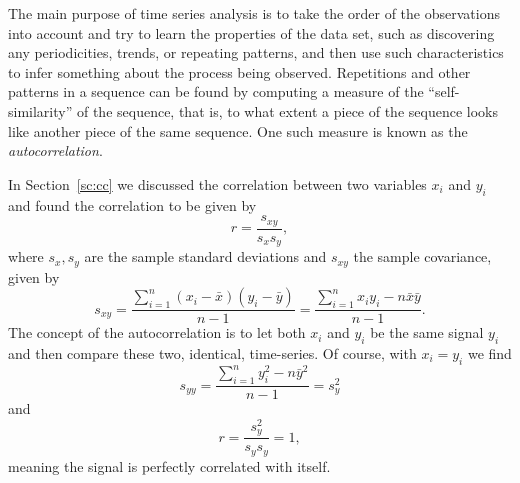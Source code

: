 	The main purpose of time series analysis is to take the order of the observations into account 
and try to learn the properties of the data set, such as discovering any periodicities, trends, or repeating patterns, and 
then use such characteristics to infer something about the process being observed.  Repetitions and 
other patterns in a sequence can be found by computing a measure of the ``self-similarity'' of the 
sequence, that is, to what extent a piece of the sequence looks like another piece of the same sequence.  One such 
measure is known as the \emph{autocorrelation}.
     
In Section~\ref{sc:cc} we discussed the correlation between two variables $x_i$ and $y_i$ and found the 
correlation to be given by 
\begin{equation}
r = \displaystyle \frac{s_{xy}}{s_x s_y},
\end{equation}
where $s_x, s_y$ are the sample standard deviations and $s_{xy}$ the sample covariance, given by
\begin{equation}
s_{xy} = \frac{\displaystyle \sum^n_{i=1} (x_i - \bar{x})(y_i - \bar{y})}{n-1} = \frac{\displaystyle  \sum^n_{i=1} x_i y_i - n \bar{x} \bar{y}}{n-1}.
\end{equation}
The concept of the autocorrelation is to let both $x_i$ and $y_i$ be the same signal $y_i$ and then compare 
these two, identical, time-series.  Of course, with 
$x_i = y_i$ we find
\begin{equation}
s_{yy} = \frac{\displaystyle \sum^n_{i=1} y^2_i -  n\bar{y}^2}{n-1} = s^2 _y
\end{equation}
and
\begin{equation}
r =\frac{ \displaystyle  s^2_y}{s_y s_y} = 1,
\end{equation}
meaning the signal is perfectly correlated with itself.


